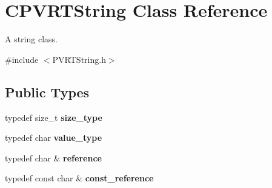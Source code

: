 \hypertarget{class_c_p_v_r_t_string}{\section{C\+P\+V\+R\+T\+String Class Reference}
\label{class_c_p_v_r_t_string}
}


A string class.  




{\ttfamily \#include $<$P\+V\+R\+T\+String.\+h$>$}

\subsection*{Public Types}
\begin{DoxyCompactItemize}
\item 
\hypertarget{class_c_p_v_r_t_string_a304b4330cfa67e6f173b01f8bf2247a3}{typedef size\+\_\+t {\bfseries size\+\_\+type}}\label{class_c_p_v_r_t_string_a304b4330cfa67e6f173b01f8bf2247a3}

\item 
\hypertarget{class_c_p_v_r_t_string_a8944463157d91769a783125684ff8801}{typedef char {\bfseries value\+\_\+type}}\label{class_c_p_v_r_t_string_a8944463157d91769a783125684ff8801}

\item 
\hypertarget{class_c_p_v_r_t_string_a6dbc99fad0efe9491c48a7995ca0cd30}{typedef char \& {\bfseries reference}}\label{class_c_p_v_r_t_string_a6dbc99fad0efe9491c48a7995ca0cd30}

\item 
\hypertarget{class_c_p_v_r_t_string_aeed6bfe4e4cb81083fb65e52d7651bfc}{typedef const char \& {\bfseries const\+\_\+reference}}\label{class_c_p_v_r_t_string_aeed6bfe4e4cb81083fb65e52d7651bfc}

\end{DoxyCompactItemize}
